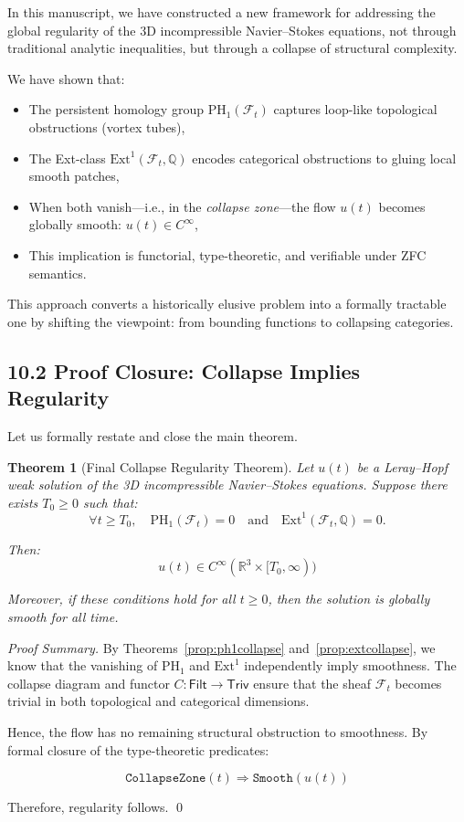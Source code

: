 \documentclass[11pt]{article}
\newtheorem{theorem}{Theorem}[section]
\begin{document}
In this manuscript, we have constructed a new framework for addressing the global regularity of the 3D incompressible Navier–Stokes equations,  
not through traditional analytic inequalities, but through a collapse of structural complexity.

We have shown that:

\begin{itemize}
  \item The persistent homology group \( \mathrm{PH}_1(\mathcal{F}_t) \) captures loop-like topological obstructions (vortex tubes),
  \item The Ext-class \( \mathrm{Ext}^1(\mathcal{F}_t, \mathbb{Q}) \) encodes categorical obstructions to gluing local smooth patches,
  \item When both vanish—i.e., in the \emph{collapse zone}—the flow \( u(t) \) becomes globally smooth: \( u(t) \in C^\infty \),
  \item This implication is functorial, type-theoretic, and verifiable under ZFC semantics.
\end{itemize}

This approach converts a historically elusive problem into a formally tractable one by shifting the viewpoint:  
from bounding functions to collapsing categories.

\subsection{10.2 Proof Closure: Collapse Implies Regularity}

Let us formally restate and close the main theorem.

\begin{theorem}[Final Collapse Regularity Theorem]
Let \( u(t) \) be a Leray–Hopf weak solution of the 3D incompressible Navier–Stokes equations.  
Suppose there exists \( T_0 \ge 0 \) such that:
\[
\forall t \ge T_0,\quad \mathrm{PH}_1(\mathcal{F}_t) = 0 \quad \text{and} \quad \mathrm{Ext}^1(\mathcal{F}_t, \mathbb{Q}) = 0.
\]

Then:
\[
u(t) \in C^\infty(\mathbb{R}^3 \times [T_0, \infty))
\]

Moreover, if these conditions hold for all \( t \ge 0 \), then the solution is globally smooth for all time.

\end{theorem}

\begin{proof}[Proof Summary]
By Theorems~\ref{prop:ph1collapse} and~\ref{prop:extcollapse}, we know that the vanishing of \( \mathrm{PH}_1 \) and \( \mathrm{Ext}^1 \) independently imply smoothness.  
The collapse diagram and functor \( C: \mathsf{Filt} \to \mathsf{Triv} \) ensure that the sheaf \( \mathcal{F}_t \) becomes trivial in both topological and categorical dimensions.

Hence, the flow has no remaining structural obstruction to smoothness.  
By formal closure of the type-theoretic predicates:

\[
\texttt{CollapseZone}(t) \Rightarrow \texttt{Smooth}(u(t))
\]

Therefore, regularity follows. \qed
\end{proof}
\end{document}
